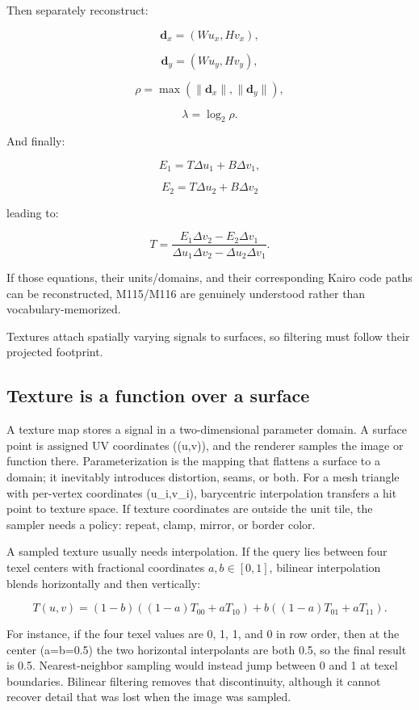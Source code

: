 Then separately reconstruct:

\[
\mathbf d_x=
(Wu_x,Hv_x),
\]

\[
\mathbf d_y=
(Wu_y,Hv_y),
\]

\[
\rho=
\max(
\|\mathbf d_x\|,
\|\mathbf d_y\|
),
\]

\[
\lambda=\log_2\rho.
\]

And finally:

\[
E_1=T\Delta u_1+B\Delta v_1,
\]

\[
E_2=T\Delta u_2+B\Delta v_2
\]

leading to:

\[
T=
\frac{
E_1\Delta v_2-E_2\Delta v_1
}{
\Delta u_1\Delta v_2-
\Delta u_2\Delta v_1
}.
\]

If those equations, their units/domains, and their corresponding Kairo code paths can be reconstructed, M115/M116 are genuinely understood rather than vocabulary-memorized.

Textures attach spatially varying signals to surfaces, so filtering must follow their projected footprint.

\subsection{Texture is a function over a surface}\label{03-visual-computing-i-ch019-texture-is-a-function-over-a-surface}

\hypertarget{03-visual-computing-i-ch019-texture-is-a-function-over-a-surface}{}

A texture map stores a signal in a two-dimensional parameter domain. A surface point is assigned UV coordinates ((u,v)), and the renderer samples the image or function there. Parameterization is the mapping that flattens a surface to a domain; it inevitably introduces distortion, seams, or both. For a mesh triangle with per-vertex coordinates (u\_i,v\_i), barycentric interpolation transfers a hit point to texture space. If texture coordinates are outside the unit tile, the sampler needs a policy: repeat, clamp, mirror, or border color.

A sampled texture usually needs interpolation. If the query lies between four texel centers with fractional coordinates \(a,b\in[0,1]\), bilinear interpolation blends horizontally and then vertically:

\[
T(u,v)=(1-b)((1-a)T_{00}+aT_{10})+b((1-a)T_{01}+aT_{11}).
\]

For instance, if the four texel values are 0, 1, 1, and 0 in row order, then at the center (a=b=0.5) the two horizontal interpolants are both 0.5, so the final result is 0.5. Nearest-neighbor sampling would instead jump between 0 and 1 at texel boundaries. Bilinear filtering removes that discontinuity, although it cannot recover detail that was lost when the image was sampled.

